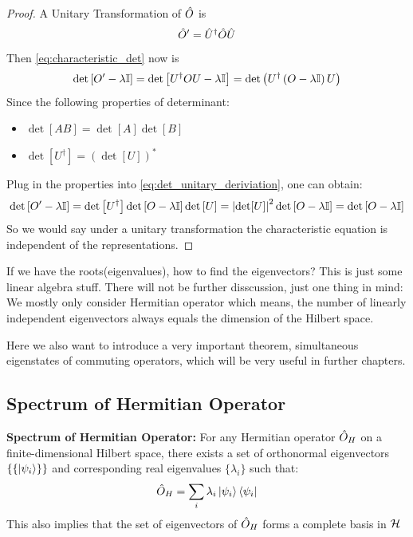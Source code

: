 \begin{proof}
    A Unitary Transformation of $\hat{O}$ is 
    \begin{eqnarray}
        \hat{O}' = \hat{U}^ \dag \hat{O} \hat{U}
    \end{eqnarray}
    Then \cref{eq:characteristic_det} now is 
    \begin{eqnarray}
        \det \left[ O' - \lambda \mathbb{I} \right] = \det\left[ U^ \dag O U - \lambda \mathbb{I} \right]  = \det \left( U^ \dag \left(O - \lambda \mathbb{I}\right) U \right) \label{eq:det_unitary_deriviation}
    \end{eqnarray}
    Since the following properties of determinant: 
    \begin{itemize}
        \item $\det\left[AB\right] = \det[A]\det[B]$
        \item $\det\left[U^ \dag \right] = \left(\det[U]\right)^*$
    \end{itemize}
    Plug in the properties into \cref{eq:det_unitary_deriviation}, one can obtain: 
    \begin{eqnarray*}
        \det \left[ O' - \lambda \mathbb{I} \right] = \det \left[U^ \dag\right] \det\left[ O - \lambda \mathbb{I} \right] \det \left[ U \right] =\left| \det[U] \right|^2 \det\left[O - \lambda \mathbb{I}\right] = \det \left[O - \lambda \mathbb{I}\right]
    \end{eqnarray*}
    So we would say under a unitary transformation the characteristic equation is independent of the representations.
\end{proof}
If we have the roots(eigenvalues), how to find the eigenvectors? This is just some linear algebra stuff. There will not be further disscussion, just one thing in mind: We mostly only consider Hermitian operator which means, the number of linearly independent eigenvectors always equals the dimension of the Hilbert space.

Here we also want to introduce a very important theorem, simultaneous eigenstates of commuting operators, which will be very useful in further chapters.


\newpage
\subsection{Spectrum of Hermitian Operator}
\begin{theorem}{\textbf{Spectrum of Hermitian Operator:}} \label{theorem:spectrum_hermitian}
    For any Hermitian operator $\hat{O}_H$ on a finite-dimensional Hilbert space, there exists a set of orthonormal eigenvectors $\{ \{\ket{\psi_i}\} \}$ and corresponding real eigenvalues $\{ \lambda_i \}$ such that:
    \begin{eqnarray}
        \hat{O}_H = \sum_i \lambda_i \ket{\psi_i} \bra{\psi_i} \label{eq:spectrum_Hermitian}
    \end{eqnarray}
    This also implies that the set of eigenvectors of $\hat{O}_H$ forms a complete basis in $\mathcal{H}$
\end{theorem}

